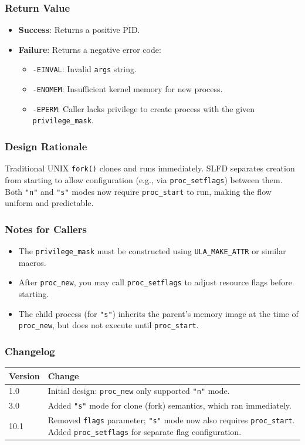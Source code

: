 \documentclass[12pt,a4paper]{article}
\begin{document}
\subsubsection{Return Value}
\begin{itemize}
    \item \textbf{Success}: Returns a positive PID.
    \item \textbf{Failure}: Returns a negative error code:
        \begin{itemize}
            \item \texttt{-EINVAL}: Invalid \texttt{args} string.
            \item \texttt{-ENOMEM}: Insufficient kernel memory for new process.
            \item \texttt{-EPERM}: Caller lacks privilege to create process with the given \texttt{privilege\_mask}.
        \end{itemize}
\end{itemize}

\subsubsection{Design Rationale}
Traditional UNIX \texttt{fork()} clones and runs immediately. SLFD separates creation from starting to allow configuration (e.g., via \texttt{proc\_setflags}) between them. Both \texttt{"n"} and \texttt{"s"} modes now require \texttt{proc\_start} to run, making the flow uniform and predictable.

\subsubsection{Notes for Callers}
\begin{itemize}
    \item The \texttt{privilege\_mask} must be constructed using \texttt{ULA\_MAKE\_ATTR} or similar macros.
    \item After \texttt{proc\_new}, you may call \texttt{proc\_setflags} to adjust resource flags before starting.
    \item The child process (for \texttt{"s"}) inherits the parent's memory image at the time of \texttt{proc\_new}, but does not execute until \texttt{proc\_start}.
\end{itemize}

\subsubsection{Changelog}
\begin{tabularx}{\textwidth}{|l|X|}
\hline
\textbf{Version} & \textbf{Change} \\
\hline
1.0 & Initial design: \texttt{proc\_new} only supported \texttt{"n"} mode. \\
3.0 & Added \texttt{"s"} mode for clone (fork) semantics, which ran immediately. \\
10.1 & Removed \texttt{flags} parameter; \texttt{"s"} mode now also requires \texttt{proc\_start}. Added \texttt{proc\_setflags} for separate flag configuration. \\
\hline
\end{tabularx}
\end{document}
